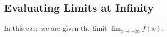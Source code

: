 \documentclass[12pt]{article}
\begin{document}

%
%


\subsection{Evaluating Limits at Infinity}
\label{ssec:inf}
In this case we are given the limit $\displaystyle{\lim_{x\to \pm\infty}f(x)}$. 

\end{document}
